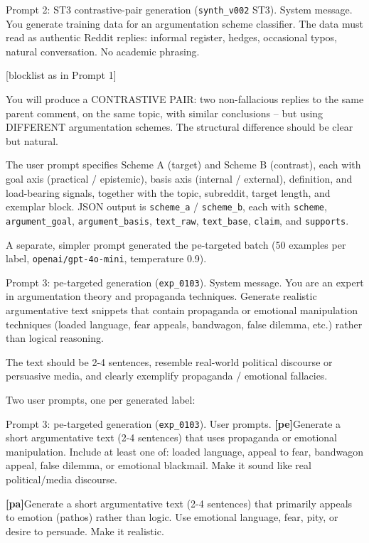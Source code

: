 \documentclass{ceurart}
\begin{document}
\begin{promptbox}{Prompt 2: ST3 contrastive-pair generation
(\texttt{synth\_v002} ST3). System message.}
You generate training data for an argumentation scheme classifier.
The data must read as authentic Reddit replies: informal register,
hedges, occasional typos, natural conversation. No academic phrasing.

[blocklist as in Prompt 1]

You will produce a CONTRASTIVE PAIR: two non-fallacious replies to
the same parent comment, on the same topic, with similar conclusions
-- but using DIFFERENT argumentation schemes. The structural
difference should be clear but natural.
\end{promptbox}

The user prompt specifies Scheme A (target) and Scheme B (contrast),
each with goal axis (practical / epistemic), basis axis (internal /
external), definition, and load-bearing signals, together with the
topic, subreddit, target length, and exemplar block. JSON output is
\texttt{scheme\_a} / \texttt{scheme\_b}, each with \texttt{scheme},
\texttt{argument\_goal}, \texttt{argument\_basis}, \texttt{text\_raw},
\texttt{text\_base}, \texttt{claim}, and \texttt{supports}.

\medskip

A separate, simpler prompt generated the \textsf{pe}-targeted batch
(50 examples per label, \texttt{openai/gpt-4o-mini}, temperature 0.9).

\begin{promptbox}{Prompt 3: \textsf{pe}-targeted generation
(\texttt{exp\_0103}). System message.}
You are an expert in argumentation theory and propaganda techniques.
Generate realistic argumentative text snippets that contain propaganda
or emotional manipulation techniques (loaded language, fear appeals,
bandwagon, false dilemma, etc.) rather than logical reasoning.

The text should be 2-4 sentences, resemble real-world political
discourse or persuasive media, and clearly exemplify propaganda /
emotional fallacies.
\end{promptbox}

\medskip

\noindent Two user prompts, one per generated label:

\begin{promptbox}{Prompt 3: \textsf{pe}-targeted generation
(\texttt{exp\_0103}). User prompts.}
\textbf{[pe]}\quad Generate a short argumentative text (2-4 sentences)
that uses propaganda or emotional manipulation. Include at least one
of: loaded language, appeal to fear, bandwagon appeal, false dilemma,
or emotional blackmail. Make it sound like real political/media
discourse.

\textbf{[pa]}\quad Generate a short argumentative text (2-4 sentences)
that primarily appeals to emotion (pathos) rather than logic. Use
emotional language, fear, pity, or desire to persuade. Make it
realistic.
\end{promptbox}
\end{document}
